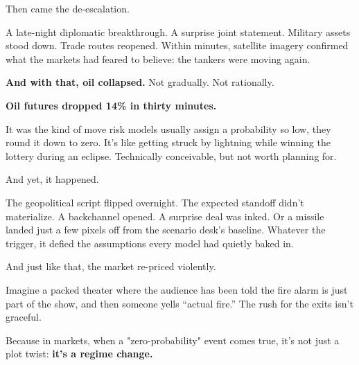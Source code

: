 \medskip


Then came the de-escalation.

A late-night diplomatic breakthrough. A surprise joint statement. Military assets stood down. Trade routes reopened. 
Within minutes, satellite imagery confirmed what the markets had feared to believe: the tankers were moving again.

\textbf{And with that, oil collapsed.} Not gradually. Not rationally.

\textbf{Oil futures dropped 14\% in thirty minutes.}


It was the kind of move risk models usually assign a probability so low, they round it down to zero.  It’s like getting 
struck by lightning while winning the lottery during an eclipse. Technically conceivable, but not worth planning for.

And yet, it happened.

The geopolitical script flipped overnight. The expected standoff didn’t materialize. A backchannel opened. A surprise 
deal was inked. Or a missile landed just a few pixels off from the scenario desk's baseline. Whatever the trigger, it 
defied the assumptions every model had quietly baked in.

And just like that, the market re-priced violently.

Imagine a packed theater where the audience has been told the fire alarm is just part of the show, and then someone 
yells “actual fire.” The rush for the exits isn’t graceful. 

Because in markets, when a "zero-probability" event comes true, it's not just a plot twist:
\textbf{it's a regime change.}

\medskip

